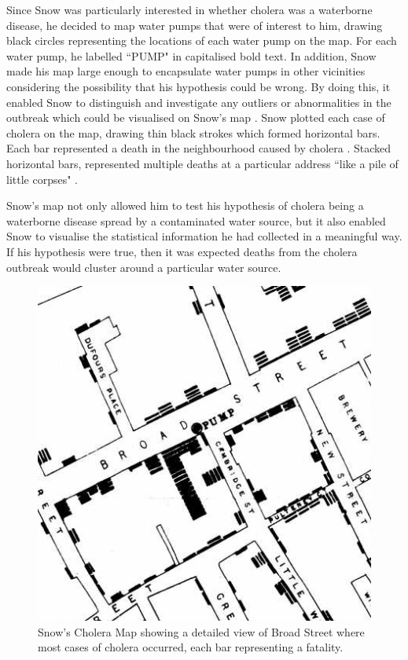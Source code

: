 \documentclass[12pt]{article}
\begin{document}
Since Snow was particularly interested in whether cholera was a waterborne disease, he decided to map water pumps that were of interest to him, drawing black circles representing the locations of each water pump on the map. For each water pump, he labelled ``PUMP" in capitalised bold text. In addition, Snow made his map large enough to encapsulate water pumps in other vicinities considering the possibility that his hypothesis could be wrong. By doing this, it enabled Snow to distinguish and investigate any outliers or abnormalities in the outbreak which could be visualised on Snow's map \cite{blog}. Snow plotted each case of cholera on the map, drawing thin black strokes which formed horizontal bars. Each bar represented a death in the neighbourhood caused by cholera \cite{tedtalk}. Stacked horizontal bars, represented multiple deaths at a particular address ``like a pile of little corpses" \cite{blog}.

Snow's map not only allowed him to test his hypothesis of cholera being a waterborne disease spread by a contaminated water source, but it also enabled Snow to visualise the statistical information he had collected in a meaningful way. If his hypothesis were true, then it was expected deaths from the cholera outbreak would cluster around a particular water source. 

\begin{figure}
\centering
\includegraphics[scale=0.8]{snow_map_detail}
\caption{Snow's Cholera Map showing a detailed view of Broad Street where most cases of cholera occurred, each bar representing a fatality. }
\label{fig:snow}
\end{figure}
\end{document}
